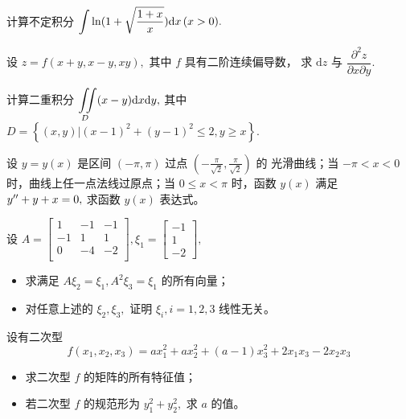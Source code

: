 \begin{quest}[2009T16]
    计算不定积分 $ \displaystyle \int \ln(1+\displaystyle\sqrt{\dfrac{1+x}{x}})\mathrm{d}x\,(x > 0). $ 
\end{quest}

\begin{quest}[2009T7]
    设 $ z = f(x+y,x-y,xy), $ 其中 $ f $ 具有二阶连续偏导数，
    求 $ \mathrm{d}z $ 与 $ \dfrac{\partial^2 z}{\partial x\partial y}. $ 
\end{quest}

\begin{quest}[2009T19]
    计算二重积分 
    $\displaystyle \iint\limits_{D}(x-y)\mathrm{d}x\mathrm{d}y, $ 
    其中 $ D = \left\{(x,y)|(x-1)^2+(y-1)^2 \leq 2, y\geq x\right\}.$ 
\end{quest}

\begin{quest}[2009T20]
    设 $ y = y(x) $ 是区间 $ (-\pi,\pi) $ 过点 $ (-\frac{\pi}{\sqrt2},\frac{\pi}{\sqrt2}) $ 的
    光滑曲线；当 $ -\pi<x<0 $ 时，曲线上任一点法线过原点；当 $ 0 \leq x < \pi $ 时，函数 $ y(x) $ 
    满足 $ y^{\prime\prime} + y + x = 0, $ 求函数 $ y(x) $ 表达式。
\end{quest}

\begin{quest}[2009T22]
    设 $ A = \begin{bmatrix}
        1&-1&-1\\-1&1&1\\0&-4&-2\\
    \end{bmatrix},\xi_1 =\begin{bmatrix}
        -1\\ 1\\-2 
    \end{bmatrix}, $ 
    \begin{itemize}
        \item 求满足 $ A\xi_2 = \xi_1, A^2\xi_3 = \xi_1 $ 的所有向量；
        \item 对任意上述的 $ \xi_2,\xi_3, $ 证明 $ \xi_i,i = 1,2,3 $ 线性无关。
    \end{itemize}
\end{quest}

\begin{quest}[2009T23]
    设有二次型
    $$
        f(x_1,x_2,x_3) = ax_1^2 + ax_2^2 + (a-1)x_3^2
        +2x_1x_3 - 2x_2x_3
    $$
    \begin{itemize}
        \item 求二次型 $ f $ 的矩阵的所有特征值；
        \item 若二次型 $ f $ 的规范形为 $ y^2_1 + y^2_2, $ 求 $ a $ 的值。
    \end{itemize}
\end{quest}

